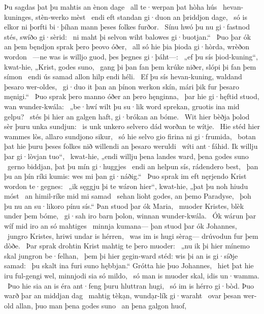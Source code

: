 Þu sagdas þat þu mahtis an ènon dage \hld\ all te·werpan
þat hòha hús \hld\ hevan-kuninges,
stèn-werko mèst \hld\ endi eft standan gi·duon
an þriddjon dage, \hld\ só is elkor ni þorfti bi·þíhan mann
þeses folkes furðor. \hld\ Sínu hwó þu nu gi·fastnod stés,
swíðo gi·sèrid: \hld\ ni maht þi selvon wiht
balowes gi·buotjan.“ \hld\ Þuo þar ók an þem bęndjon sprak
þero þeovo óðer, \hld\ all só hie þia þioda gi·hòrda,
wrèðon wordon \hld\ —ne was is willjo guod,
þes þegnes gi·þáht—: \hld\ „ef þu sís þiod-kuning“, kwat-hie,
„Krist, godes suno, \hld\ gang þi þan fan þem krúke niðer,
slópi þi fan þem símon \hld\ endi ús samad allon
hilp endi héli. \hld\ Ef þu sís hevan-kuning,
waldand þesaro wer-oldes, \hld\ gi·duo it þan an þínon werkon skín,
mári þik fur þesaro męnigi.“ \hld\ Þuo sprak þero manno óðer
an þero hęnginna, \hld\ þar hie gi·hęftid stuod,
wan wunder-kwála: \hld\ „be·hwí wilt þu su·lik word sprekan,
gruotis ina mid gelpu? \hld\ stés þi hier an galgen haft,
gi·brókan an bóme. \hld\ Wit hier bèðja þolod
sèr þuru unka sundjun: \hld\ is unk unkero selvero dád
worðan te wítje. \hld\ Hie stéd hier wammes lòs,
allaro sundjono sikur, \hld\ só hie selvo gio
firina ni gi·frumida, \hld\ botan þat hie þuru þeses folkes nið
willendi an þesaro weruldi \hld\ wíti ant·fáhid.
Ik willju þar gi·lòvjan tuo“, \hld\ kwat-hie, „endi willju þena landes ward,
þena godes suno \hld\ gerno biddjan,
þat þu mín gi·huggjes \hld\ endi an helpun sís,
rádendero best, \hld\ þan þu an þín ríki kumis:
wes mi þan gi·náðig.“ \hld\ Þuo sprak im eft nęrjendo Krist
wordon te·gegnes: \hld\ „ik sęggju þi te wáron hier“, kwat-hie,
„þat þu noh hiudu móst \hld\ an himil-ríke
mid mi samad \hld\ sehan lioht godes,
an þemo Paradyse, \hld\ þoh þu nu an su·likoro pínu sís.“
Þan stuod þar ók Maria, \hld\ muoder Kristes,
blèk under þem bóme, \hld\ gi·sah iro barn þolon,
winnan wunder-kwála. \hld\ Ók wárun þar wíf mid iro
an só mahtiges \hld\ minnja kumana—
þan stuod þar ók Johannes, \hld\ jungro Kristes,
hriwi undar is hérren, \hld\ was im is hugi sèrag—
drúvodun fur þem dòðe. \hld\ Þar sprak drohtin Krist
mahtig te þero muoder: \hld\ „nu ik þi hier mínemo skal
jungron be·felhan, \hld\ þem þi hier gegin-ward stéd:
wis þi an is gi·síðje samad: \hld\ þu skalt ina furi suno hębbjan.“
Grótta hie þuo Johannes, \hld\ hiet þat hie iru ful-gengi wel,
minnjodi sia só mildo, \hld\ só man is muoder skal,
idis un·wamma. \hld\ Þuo hie sia an is éra ant·feng
þuru hluttran hugi, \hld\ só im is hérro gi·bòd.
Þuo warð þar an middjan dag \hld\ mahtig tèkạn,
wundạr-lík gi·waraht \hld\ ovar þesan wer-old allan,
þuo man þena godes suno \hld\ an þena galgon huof,
